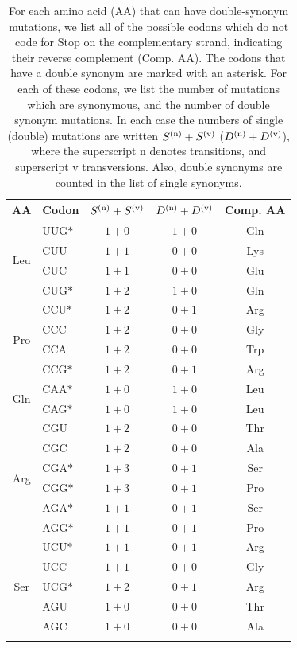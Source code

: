 \documentclass[unnumsec,webpdf,contemporary,large,namedate]{oup-authoring-template}%
\theoremstyle{thmstyleone}%
\theoremstyle{thmstyletwo}%
\theoremstyle{thmstylethree}%
\begin{document}
\begin{table}[t]
\caption{For each amino acid (AA) that can have double-synonym mutations, we list
all of the possible codons which do not code for Stop on the complementary strand, indicating
their reverse complement (Comp. AA).
The codons that have a double synonym are marked with an asterisk.
For each of these codons, we list the number of mutations which are synonymous,
and the number of double synonym mutations. In each case the numbers of single (double) mutations are written
$S^{({\rm n})}+S^{({\rm v})}$ ($D^{({\rm n})}+D^{({\rm v})}$), where the superscript n denotes transitions,
and superscript v transversions. Also, double synonyms are counted in the list of single synonyms.
\label{tab: 1}}
\begin{tabular*}{\columnwidth}{@{\extracolsep\fill}clccc@{\extracolsep\fill}}
\toprule
AA&Codon&$S^{({\rm n})}+S^{({\rm v})}$&$D^{({\rm n})}+D^{({\rm v})}$&Comp. AA\\
\midrule
\multirow{4}{*}{Leu} &UUG$\ast$&$1+0$&$1+0$&Gln\\
       &CUU&$1+1$&$0+0$&Lys\\
       &CUC&$1+1$&$0+0$&Glu\\
       &CUG$\ast$&$1+2$&$1+0$&Gln\\
\midrule
\multirow{4}{*}{Pro} &CCU$\ast$&$1+2$&$0+1$&Arg\\
       &CCC&$1+2$&$0+0$&Gly\\
       &CCA&$1+2$&$0+0$&Trp\\
       &CCG$\ast$&$1+2$&$0+1$&Arg\\
\midrule
\multirow{2}{*}{Gln} &CAA$\ast$&$1+0$&$1+0$&Leu\\
       &CAG$\ast$&$1+0$&$1+0$&Leu\\
\midrule
\multirow{6}{*}{Arg} &CGU&$1+2$&$0+0$&Thr\\
       &CGC&$1+2$&$0+0$&Ala\\
       &CGA$\ast$&$1+3$&$0+1$&Ser\\
       &CGG$\ast$&$1+3$&$0+1$&Pro\\
       &AGA$\ast$&$1+1$&$0+1$&Ser\\
       &AGG$\ast$&$1+1$&$0+1$&Pro\\
\midrule
\multirow{5}{*}{Ser} &UCU$\ast$&$1+1$&$0+1$&Arg\\
       &UCC&$1+1$&$0+0$&Gly\\
       &UCG$\ast$&$1+2$&$0+1$&Arg\\
       &AGU&$1+0$&$0+0$&Thr\\
       &AGC&$1+0$&$0+0$&Ala\\
\botrule
\end{tabular*}
\end{table}
\end{document}
